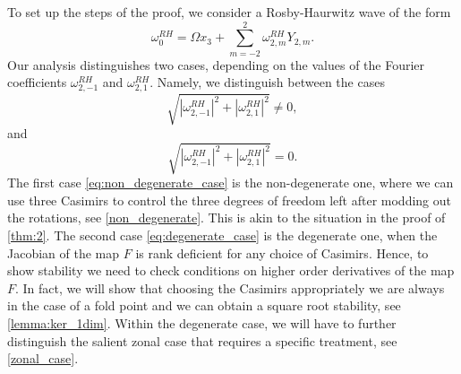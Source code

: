 \documentclass{amsart}
\begin{document}
To set up the steps of the proof, we consider a Rosby-Haurwitz wave of the form
$$
\omega_0^{RH} = \Omega x_3 + \sum_{m=-2}^2 \omega^{RH}_{2,m} Y_{2,m}.
$$
Our analysis distinguishes two cases, depending on the values of the Fourier coefficients $\omega^{RH}_{2,-1}$ and $\omega^{RH}_{2,1}$. Namely, we distinguish between the cases
\begin{equation}
    \sqrt{|\omega^{RH}_{2,-1}|^2+|\omega^{RH}_{2,1}|^2}\neq0,
    \label{eq:non_degenerate_case}
\end{equation}
and
\begin{equation}
    \sqrt{|\omega^{RH}_{2,-1}|^2+|\omega^{RH}_{2,1}|^2}=0.
    \label{eq:degenerate_case}
\end{equation}
The first case \eqref{eq:non_degenerate_case} is the non-degenerate one, where we can use three Casimirs to control the three degrees of freedom left after modding out the rotations, see \cref{non_degenerate}. This is akin to the situation in the proof of \cref{thm:2}. The second case \eqref{eq:degenerate_case} is the degenerate one, when the Jacobian of the map $F$ is rank deficient for any choice of Casimirs. Hence, to show stability we need to check conditions on higher order derivatives of the map $F$. In fact, we will show that choosing the Casimirs appropriately we are always in the case of a fold point and we can obtain a square root stability, see \cref{lemma:ker_1dim}. Within the degenerate case, we will have to further distinguish the salient zonal case that requires a specific treatment, see \cref{zonal_case}.
\end{document}
